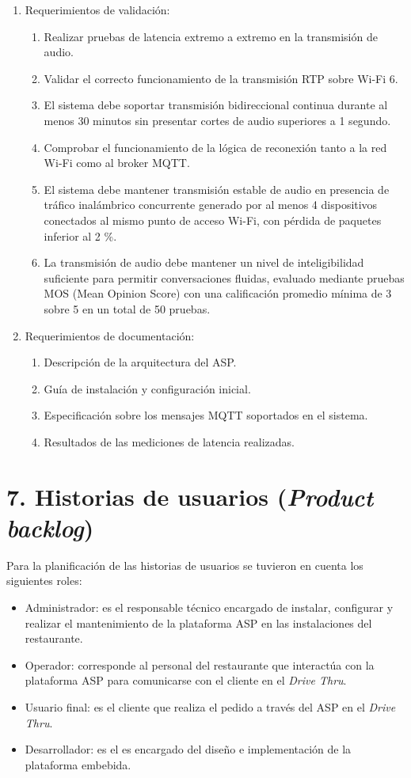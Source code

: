 \documentclass[
11pt, %
]{charter}
\newcommand{\driveThru}{\textit{Drive Thru}}
\begin{document}
\begin{enumerate}
	\item Requerimientos de validación:
		\begin{enumerate}
			\item Realizar pruebas de latencia extremo a extremo en la transmisión de audio.
			\item Validar el correcto funcionamiento de la transmisión RTP sobre Wi-Fi 6.
			\item El sistema debe soportar transmisión bidireccional continua durante al menos 30 minutos sin presentar cortes de audio superiores a 1 segundo.
			\item Comprobar el funcionamiento de la lógica de reconexión tanto a la red Wi-Fi como al broker MQTT.
			\item El sistema debe mantener transmisión estable de audio en presencia de tráfico inalámbrico concurrente generado por al menos 4 dispositivos conectados al mismo punto de acceso Wi-Fi, con pérdida de paquetes inferior al 2 \%.
			\item La transmisión de audio debe mantener un nivel de inteligibilidad suficiente para permitir conversaciones fluidas, evaluado mediante pruebas MOS (Mean Opinion Score) con una calificación promedio mínima de 3 sobre 5 en un total de 50 pruebas.

		\end{enumerate}

	\item Requerimientos de documentación:
		\begin{enumerate}
			\item Descripción de la arquitectura del ASP.
			\item Guía de instalación y configuración inicial.
			\item Especificación sobre los mensajes MQTT soportados en el sistema.
			\item Resultados de las mediciones de latencia realizadas.
		\end{enumerate}
\end{enumerate}


\section{7. Historias de usuarios (\textit{Product backlog})}
\label{sec:backlog}

Para la planificación de las historias de usuarios se tuvieron en cuenta los siguientes roles:
\begin{itemize}

	\item Administrador: es el responsable técnico encargado de instalar, configurar y realizar el mantenimiento de la plataforma ASP en las instalaciones del restaurante.
	\item Operador: corresponde al personal del restaurante que interactúa con la plataforma ASP para comunicarse con el cliente en el \driveThru.
	\item Usuario final: es el cliente que realiza el pedido a través del ASP en el \driveThru.
	\item Desarrollador: es el \authorname es encargado del diseño e implementación de la plataforma embebida.
\end{itemize}
\end{document}

